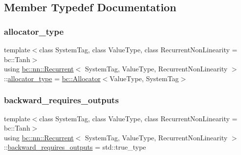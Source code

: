 \subsection{Member Typedef Documentation}
\mbox{\label{structbc_1_1nn_1_1Recurrent_ad327a3345cf6cc3199f0e5670a3d058d}} 
\subsubsection{\texorpdfstring{allocator\+\_\+type}{allocator\_type}}
{\footnotesize\ttfamily template$<$class System\+Tag, class Value\+Type, class Recurrent\+Non\+Linearity = bc\+::\+Tanh$>$ \\
using \hyperlink{structbc_1_1nn_1_1Recurrent}{bc\+::nn\+::\+Recurrent}$<$ System\+Tag, Value\+Type, Recurrent\+Non\+Linearity $>$\+::\hyperlink{structbc_1_1nn_1_1Recurrent_ad327a3345cf6cc3199f0e5670a3d058d}{allocator\+\_\+type} =  \hyperlink{classbc_1_1allocators_1_1Allocator}{bc\+::\+Allocator}$<$Value\+Type, System\+Tag$>$}

\mbox{\label{structbc_1_1nn_1_1Recurrent_a3697ec607c320d6e7719764a299d8a54}} 
\subsubsection{\texorpdfstring{backward\+\_\+requires\+\_\+outputs}{backward\_requires\_outputs}}
{\footnotesize\ttfamily template$<$class System\+Tag, class Value\+Type, class Recurrent\+Non\+Linearity = bc\+::\+Tanh$>$ \\
using \hyperlink{structbc_1_1nn_1_1Recurrent}{bc\+::nn\+::\+Recurrent}$<$ System\+Tag, Value\+Type, Recurrent\+Non\+Linearity $>$\+::\hyperlink{structbc_1_1nn_1_1Recurrent_a3697ec607c320d6e7719764a299d8a54}{backward\+\_\+requires\+\_\+outputs} =  std\+::true\+\_\+type}

\mbox{\label{structbc_1_1nn_1_1Recurrent_a5d8408035c0c266c1f2b0f4172f7d842}} 
